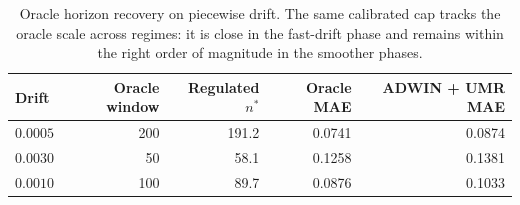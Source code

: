 \begin{table}[!htbp]
\centering
\caption{Oracle horizon recovery on piecewise drift. The same calibrated cap tracks the oracle scale across regimes: it is close in the fast-drift phase and remains within the right order of magnitude in the smoother phases.}
\label{tab:piecewise_oracle}
\begin{tabular}{lrrrr}
\toprule
Drift & Oracle window & Regulated $n^*$ & Oracle MAE & ADWIN + UMR MAE \\
\midrule
$0.0005$ & 200 & 191.2 & 0.0741 & 0.0874 \\
$0.0030$ & 50 & 58.1 & 0.1258 & 0.1381 \\
$0.0010$ & 100 & 89.7 & 0.0876 & 0.1033 \\
\bottomrule
\end{tabular}
\end{table}
